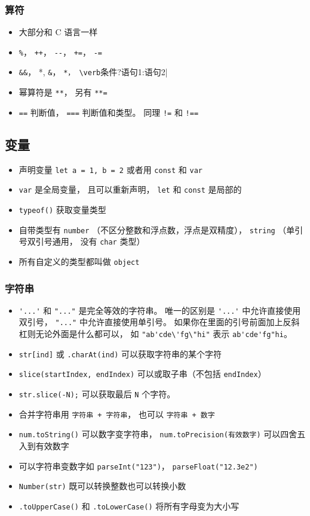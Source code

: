 \subsubsection{算符}
\begin{itemize}
\item 大部分和 C 语言一样
\item \verb|%|， \verb|++|， \verb|--|， \verb|+=|， \verb|-=|
\item \verb|&&|， \verb*||*, \verb|&|， \verb*|*， \verb|条件?语句1:语句2|
\item 幂算符是 \verb|**|， 另有 \verb|**=|
\item \verb|==| 判断值， \verb|===| 判断值和类型。 同理 \verb|!=| 和 \verb|!==|
\end{itemize}

\subsection{变量}
\begin{itemize}
\item 声明变量 \verb|let a = 1, b = 2| 或者用 \verb|const| 和 \verb|var|
\item \verb|var| 是全局变量， 且可以重新声明， \verb|let| 和 \verb|const| 是局部的
\item \verb|typeof()| 获取变量类型
\item 自带类型有 \verb|number| （不区分整数和浮点数，浮点是双精度）， \verb|string| （单引号双引号通用， 没有 \verb`char` 类型）
\item 所有自定义的类型都叫做 \verb|object|
\end{itemize}

\subsubsection{字符串}
\begin{itemize}
\item \verb`'...'` 和 \verb`"..."` 是完全等效的字符串。 唯一的区别是 \verb`'...'` 中允许直接使用双引号， \verb`"..."` 中允许直接使用单引号。 如果你在里面的引号前面加上反斜杠则无论外面是什么都可以， 如 \verb`"ab'cde\'fg\"hi"` 表示 \verb`ab'cde'fg"hi`。
\item \verb|str[ind]| 或 \verb|.charAt(ind)| 可以获取字符串的某个字符
\item \verb`slice(startIndex, endIndex)` 可以或取子串（不包括 \verb`endIndex`）
\item \verb`str.slice(-N);` 可以获取最后 \verb`N` 个字符。
\item 合并字符串用 \verb|字符串 + 字符串|， 也可以 \verb|字符串 + 数字|
\item \verb|num.toString()| 可以数字变字符串， \verb|num.toPrecision(有效数字)| 可以四舍五入到有效数字
\item 可以字符串变数字如 \verb|parseInt("123")|， \verb|parseFloat("12.3e2")|
\item \verb|Number(str)| 既可以转换整数也可以转换小数
\item \verb|.toUpperCase()| 和 \verb|.toLowerCase()| 将所有字母变为大小写
\end{itemize}


